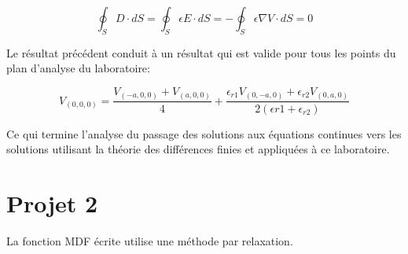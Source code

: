 \begin{equation}
\oint_S D \cdot dS = \oint_S \epsilon E \cdot dS = -\oint_S \epsilon \nabla V \cdot dS  = 0
\end{equation}

Le résultat précédent conduit à un résultat qui est valide pour tous les points du plan d'analyse du laboratoire:

\begin{equation}
V_{(0,0,0)} = \frac{V_{(-a,0,0)} + V_{(a,0,0)}}{4} + \frac{\epsilon_{r1} V_{(0,-a,0)} + \epsilon_{r2} V_{(0,a,0)}}{2(\epsilon{r1} + \epsilon_{r2})}
\end{equation}

Ce qui termine l'analyse du passage des solutions aux équations continues vers les solutions utilisant la théorie des différences finies et appliquées à ce laboratoire.
\section{Projet 2}

La fonction MDF écrite utilise une méthode par relaxation. 

